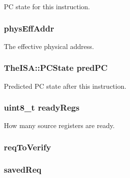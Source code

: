 \label{classBaseDynInst_ad3585c83b0eac985107aa5a86e43e1b4}
PC state for this instruction. \hypertarget{classBaseDynInst_a159ce173047bae421effda8028f07d68}{
\subsubsection[{physEffAddr}]{ {\bf physEffAddr}}}
\label{classBaseDynInst_a159ce173047bae421effda8028f07d68}
The effective physical address. \hypertarget{classBaseDynInst_aebd0b135745958ac2bdfe9deeeb60d9f}{
\subsubsection[{predPC}]{\setlength{\rightskip}{0pt plus 5cm}TheISA::PCState {\bf predPC}}}
\label{classBaseDynInst_aebd0b135745958ac2bdfe9deeeb60d9f}
Predicted PC state after this instruction. \hypertarget{classBaseDynInst_a98d0c5a64298b2b2d1bb8e99124b0963}{
\subsubsection[{readyRegs}]{\setlength{\rightskip}{0pt plus 5cm}uint8\_\-t {\bf readyRegs}}}
\label{classBaseDynInst_a98d0c5a64298b2b2d1bb8e99124b0963}
How many source registers are ready. \hypertarget{classBaseDynInst_a7a7e19d3ca6f10eed7c88a377c4cb971}{
\subsubsection[{reqToVerify}]{ {\bf reqToVerify}}}
\label{classBaseDynInst_a7a7e19d3ca6f10eed7c88a377c4cb971}
\hypertarget{classBaseDynInst_a59b330383a8be2eaba12ac79b9d28dc2}{
\subsubsection[{savedReq}]{ {\bf savedReq}}}
